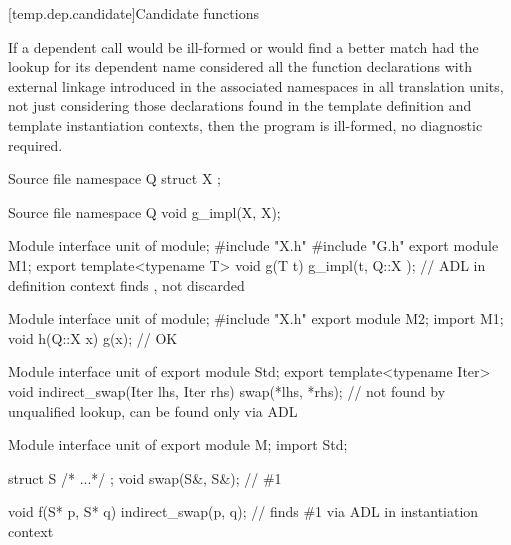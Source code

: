 [temp.dep.candidate]{Candidate functions}

\pnum
{}%
If a dependent call would be ill-formed or
would find a better match had the lookup for its dependent name
considered all the function declarations with external linkage
introduced in the associated namespaces in all translation units,
not just considering those declarations found in the template definition and
template instantiation contexts,
then the program is ill-formed, no diagnostic required.

\pnum
\begin{example}
\begin{codeblocktu}{Source file }
namespace Q {
  struct X { };
}
\end{codeblocktu}

\begin{codeblocktu}{Source file }
namespace Q {
  void g_impl(X, X);
}
\end{codeblocktu}

\begin{codeblocktu}{Module interface unit of }
module;
#include "X.h"
#include "G.h"
export module M1;
export template<typename T>
void g(T t) {
  g_impl(t, Q::X{ });   // ADL in definition context finds ,  not discarded
}
\end{codeblocktu}

\begin{codeblocktu}{Module interface unit of }
module;
#include "X.h"
export module M2;
import M1;
void h(Q::X x) {
   g(x);                // OK
}
\end{codeblocktu}
\end{example}

\pnum
\begin{example}
\begin{codeblocktu}{Module interface unit of }
export module Std;
export template<typename Iter>
void indirect_swap(Iter lhs, Iter rhs)
{
  swap(*lhs, *rhs);     //  not found by unqualified lookup, can be found only via ADL
}
\end{codeblocktu}

\begin{codeblocktu}{Module interface unit of }
export module M;
import Std;

struct S { /* ...*/ };
void swap(S&, S&);      // \#1

void f(S* p, S* q)
{
  indirect_swap(p, q);  // finds \#1 via ADL in instantiation context
}
\end{codeblocktu}
\end{example}


